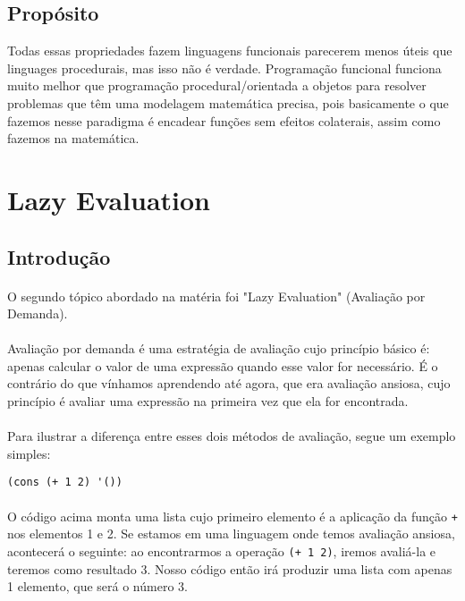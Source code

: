 \documentclass[11pt]{article}
\begin{document}
\subsection{Propósito}
\label{sec:org38756d0}
Todas essas propriedades fazem linguagens funcionais parecerem menos úteis que linguages procedurais, mas isso não é verdade. Programação
funcional funciona muito melhor que programação procedural/orientada a objetos para resolver problemas que têm uma modelagem matemática
precisa, pois basicamente o que fazemos nesse paradigma é encadear funções sem efeitos colaterais, assim como fazemos na matemática.

\color{black}
\section{Lazy Evaluation}
\label{sec:org01723f2}
\subsection{Introdução}
\label{sec:org40c6eb2}
\paragraph{} O segundo tópico abordado na matéria foi "Lazy Evaluation" (Avaliação por Demanda).

\paragraph{} Avaliação por demanda é uma estratégia de avaliação cujo princípio básico é: apenas calcular o valor de uma expressão quando
esse valor for necessário. É o contrário do que vínhamos aprendendo até agora, que era avaliação ansiosa, cujo princípio é avaliar uma
expressão na primeira vez que ela for encontrada.

\paragraph{} Para ilustrar a diferença entre esses dois métodos de avaliação, segue um exemplo simples:

\begin{verbatim}
(cons (+ 1 2) '())
\end{verbatim}

\paragraph{} O código acima monta uma lista cujo primeiro elemento é a aplicação da função \texttt{+} nos elementos 1 e 2. Se estamos em uma linguagem onde temos
avaliação ansiosa, acontecerá o seguinte: ao encontrarmos a operação \texttt{(+ 1 2)}, iremos avaliá-la e teremos como resultado 3. Nosso código
então irá produzir uma lista com apenas 1 elemento, que será o número 3.
\end{document}
